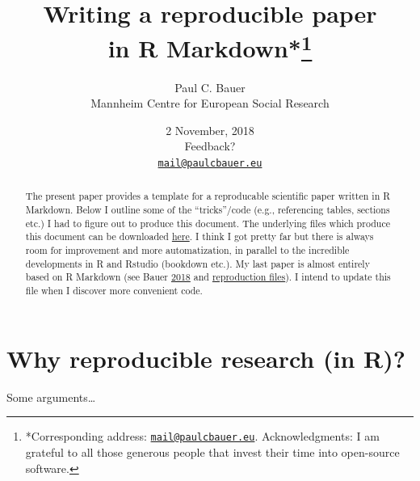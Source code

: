 \documentclass[12pt,]{article}
\title{\vspace{1cm}Writing a reproducible paper\\
in R Markdown*\footnote{*Corresponding address:
  \href{mailto:mail@paulcbauer.eu}{\nolinkurl{mail@paulcbauer.eu}}.
  Acknowledgments: I am grateful to all those generous people that
  invest their time into open-source software.}\vspace{0.5cm}\\}
\author{Paul C. Bauer\\
Mannheim Centre for European Social Research}
\date{2 November, 2018\\[2\baselineskip]Feedback?\\
\href{mailto:mail@paulcbauer.eu}{\nolinkurl{mail@paulcbauer.eu}}\\}
\theoremstyle{definition}
\theoremstyle{definition}
\theoremstyle{definition}
\theoremstyle{remark}
\begin{document}
\maketitle
\begin{abstract}
\noindent{}The present paper provides a template for a
reproducable scientific paper written in R Markdown. Below I outline
some of the ``tricks''/code (e.g., referencing tables, sections etc.) I
had to figure out to produce this document. The underlying files which
produce this document can be downloaded
\href{https://drive.google.com/drive/folders/1zJP3cNPrHN-gj0rcmbHQgg-XA0hqDXdd?usp=sharing}{here}.
I think I got pretty far but there is always room for improvement and
more automatization, in parallel to the incredible developments in R and
Rstudio (bookdown etc.). My last paper is almost entirely based on R
Markdown (see Bauer \protect\hyperlink{ref-Bauer2018-hd}{2018} and
\href{https://dataverse.harvard.edu/dataset.xhtml?persistentId=doi:10.7910/DVN/DUMGLT}{reproduction
files}). I intend to update this file when I discover more convenient
code.\vspace{.8cm}
\end{abstract}

\clearpage

\renewcommand{\baselinestretch}{0.5}

\normalsize
\tableofcontents
\renewcommand{\baselinestretch}{1.1}\normalsize

\clearpage

\section{Why reproducible research (in
R)?}\label{why-reproducible-research-in-r}

Some arguments\ldots{}
\end{document}

